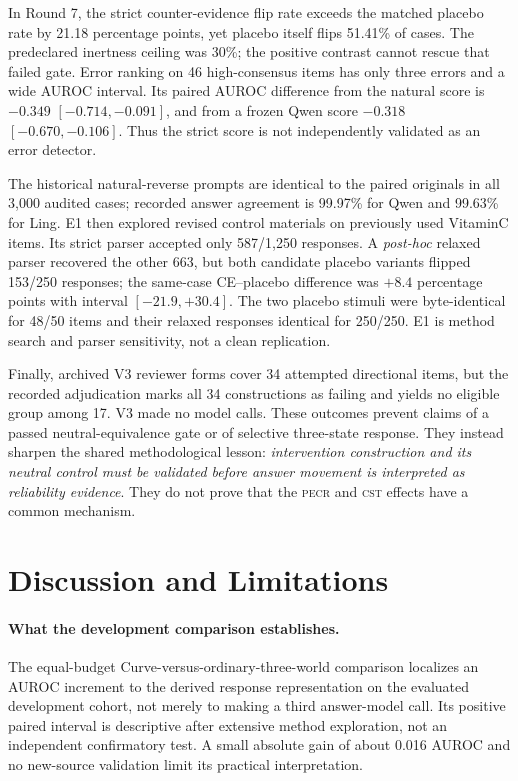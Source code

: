 \documentclass[11pt]{article}
\newcommand{\PECR}{\textsc{pecr}}
\newcommand{\CST}{\textsc{cst}}
\begin{document}
In Round 7, the strict counter-evidence flip rate exceeds the matched placebo rate by 21.18 percentage points, yet placebo itself flips 51.41\% of cases. The predeclared inertness ceiling was 30\%; the positive contrast cannot rescue that failed gate. Error ranking on 46 high-consensus items has only three errors and a wide AUROC interval. Its paired AUROC difference from the natural score is $-0.349$ $[-0.714,-0.091]$, and from a frozen Qwen score $-0.318$ $[-0.670,-0.106]$. Thus the strict score is not independently validated as an error detector.

The historical natural-reverse prompts are identical to the paired originals in all 3,000 audited cases; recorded answer agreement is 99.97\% for Qwen and 99.63\% for Ling. E1 then explored revised control materials on previously used VitaminC items. Its strict parser accepted only 587/1,250 responses. A \emph{post-hoc} relaxed parser recovered the other 663, but both candidate placebo variants flipped 153/250 responses; the same-case CE--placebo difference was $+8.4$ percentage points with interval $[-21.9,+30.4]$. The two placebo stimuli were byte-identical for 48/50 items and their relaxed responses identical for 250/250. E1 is method search and parser sensitivity, not a clean replication.

Finally, archived V3 reviewer forms cover 34 attempted directional items, but the recorded adjudication marks all 34 constructions as failing and yields no eligible group among 17. V3 made no model calls. These outcomes prevent claims of a passed neutral-equivalence gate or of selective three-state response. They instead sharpen the shared methodological lesson: \emph{intervention construction and its neutral control must be validated before answer movement is interpreted as reliability evidence}. They do not prove that the \PECR{} and \CST{} effects have a common mechanism.

\section{Discussion and Limitations}
\paragraph{What the development comparison establishes.}
The equal-budget Curve-versus-ordinary-three-world comparison localizes an AUROC increment to the derived response representation on the evaluated development cohort, not merely to making a third answer-model call. Its positive paired interval is descriptive after extensive method exploration, not an independent confirmatory test. A small absolute gain of about 0.016 AUROC and no new-source validation limit its practical interpretation.
\end{document}
